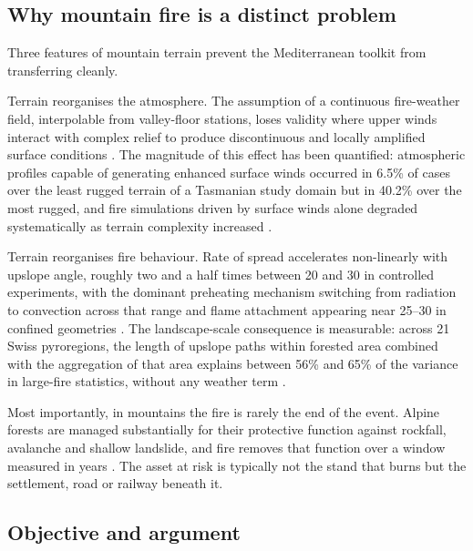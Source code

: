 \documentclass[11pt,a4paper]{article}
\begin{document}
\subsection{Why mountain fire is a distinct problem}

Three features of mountain terrain prevent the Mediterranean toolkit from transferring cleanly.

Terrain reorganises the atmosphere. The assumption of a continuous fire-weather field, interpolable from valley-floor stations, loses validity where upper winds interact with complex relief to produce discontinuous and locally amplified surface conditions \citep{sharples_overview_2009}. The magnitude of this effect has been quantified: atmospheric profiles capable of generating enhanced surface winds occurred in 6.5\% of cases over the least rugged terrain of a Tasmanian study domain but in 40.2\% over the most rugged, and fire simulations driven by surface winds alone degraded systematically as terrain complexity increased \citep{ozaki_impact_2022}.

Terrain reorganises fire behaviour. Rate of spread accelerates non-linearly with upslope angle, roughly two and a half times between 20\degree{} and 30\degree{} in controlled experiments, with the dominant preheating mechanism switching from radiation to convection across that range and flame attachment appearing near 25--30\degree{} in confined geometries \citep{hayajneh_wind_2026}. The landscape-scale consequence is measurable: across 21 Swiss pyroregions, the length of upslope paths within forested area combined with the aggregation of that area explains between 56\% and 65\% of the variance in large-fire statistics, without any weather term \citep{conedera_linking_2024}.

Most importantly, in mountains the fire is rarely the end of the event. Alpine forests are managed substantially for their protective function against rockfall, avalanche and shallow landslide, and fire removes that function over a window measured in years \citep{melzner_wildfire-induced_2025, melzner_brief_2019}. The asset at risk is typically not the stand that burns but the settlement, road or railway beneath it.

\subsection{Objective and argument}
\end{document}
